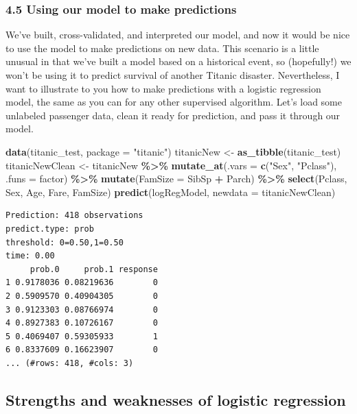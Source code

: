 \documentclass[
]{article}
\newenvironment{Shaded}{\begin{snugshade}}{\end{snugshade}}
\newcommand{\AttributeTok}[1]{\textcolor[rgb]{0.13,0.29,0.53}{#1}}
\newcommand{\FunctionTok}[1]{\textcolor[rgb]{0.13,0.29,0.53}{\textbf{#1}}}
\newcommand{\NormalTok}[1]{#1}
\newcommand{\OtherTok}[1]{\textcolor[rgb]{0.56,0.35,0.01}{#1}}
\newcommand{\SpecialCharTok}[1]{\textcolor[rgb]{0.81,0.36,0.00}{\textbf{#1}}}
\newcommand{\StringTok}[1]{\textcolor[rgb]{0.31,0.60,0.02}{#1}}
\begin{document}
\subsubsection{4.5 Using our model to make
predictions}\label{using-our-model-to-make-predictions-1}

We've built, cross-validated, and interpreted our model, and now it
would be nice to use the model to make predictions on new data. This
scenario is a little unusual in that we've built a model based on a
historical event, so (hopefully!) we won't be using it to predict
survival of another Titanic disaster. Nevertheless, I want to illustrate
to you how to make predictions with a logistic regression model, the
same as you can for any other supervised algorithm. Let's load some
unlabeled passenger data, clean it ready for prediction, and pass it
through our model.

\begin{Shaded}
\begin{Highlighting}[]
\FunctionTok{data}\NormalTok{(titanic\_test, }\AttributeTok{package =} \StringTok{"titanic"}\NormalTok{)}
\NormalTok{titanicNew }\OtherTok{\textless{}{-}} \FunctionTok{as\_tibble}\NormalTok{(titanic\_test)}
\NormalTok{titanicNewClean }\OtherTok{\textless{}{-}}\NormalTok{ titanicNew }\SpecialCharTok{\%\textgreater{}\%}
  \FunctionTok{mutate\_at}\NormalTok{(}\AttributeTok{.vars =} \FunctionTok{c}\NormalTok{(}\StringTok{"Sex"}\NormalTok{, }\StringTok{"Pclass"}\NormalTok{), }\AttributeTok{.funs =}\NormalTok{ factor) }\SpecialCharTok{\%\textgreater{}\%}
  \FunctionTok{mutate}\NormalTok{(}\AttributeTok{FamSize =}\NormalTok{ SibSp }\SpecialCharTok{+}\NormalTok{ Parch) }\SpecialCharTok{\%\textgreater{}\%}
  \FunctionTok{select}\NormalTok{(Pclass, Sex, Age, Fare, FamSize)}
\FunctionTok{predict}\NormalTok{(logRegModel, }\AttributeTok{newdata =}\NormalTok{ titanicNewClean)}
\end{Highlighting}
\end{Shaded}

\begin{verbatim}
Prediction: 418 observations
predict.type: prob
threshold: 0=0.50,1=0.50
time: 0.00
     prob.0     prob.1 response
1 0.9178036 0.08219636        0
2 0.5909570 0.40904305        0
3 0.9123303 0.08766974        0
4 0.8927383 0.10726167        0
5 0.4069407 0.59305933        1
6 0.8337609 0.16623907        0
... (#rows: 418, #cols: 3)
\end{verbatim}

\subsection{Strengths and weaknesses of logistic
regression}\label{strengths-and-weaknesses-of-logistic-regression}
\end{document}
